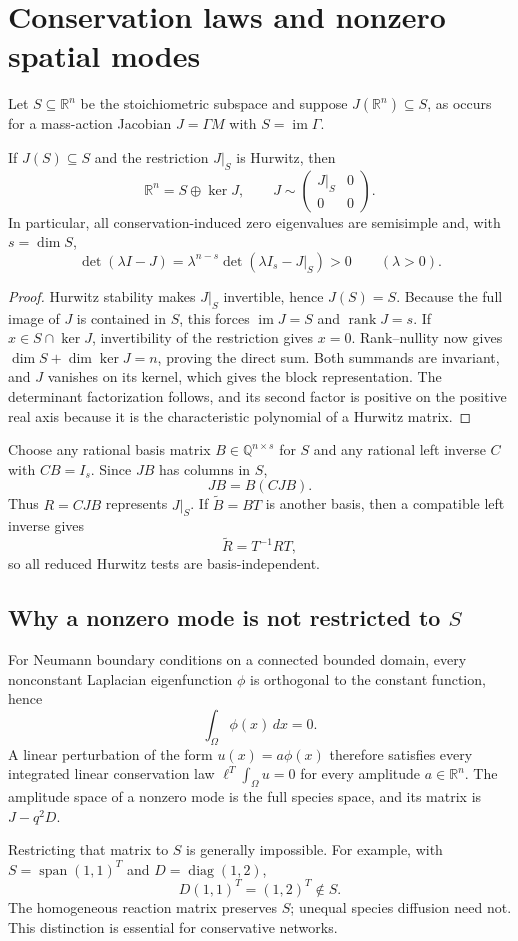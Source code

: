 \section{Conservation laws and nonzero spatial modes}
\label{sec:conservation-independent}

Let $S\subseteq\mathbb R^n$ be the stoichiometric subspace and suppose
$J(\mathbb R^n)\subseteq S$, as occurs for a mass-action Jacobian
$J=\Gamma M$ with $S=\operatorname{im}\Gamma$.

\begin{proposition}
\label{prop:conservation-splitting-independent}
If $J(S)\subseteq S$ and the restriction $J|_S$ is Hurwitz, then
\[
 \mathbb R^n=S\oplus\ker J,
 \qquad
 J\sim\begin{pmatrix}J|_S&0\\0&0\end{pmatrix}.
\]
In particular, all conservation-induced zero eigenvalues are semisimple and,
with $s=\dim S$,
\[
 \det(\lambda I-J)=\lambda^{n-s}
 \det(\lambda I_s-J|_S)>0\qquad(\lambda>0).
\]
\end{proposition}

\begin{proof}
Hurwitz stability makes $J|_S$ invertible, hence $J(S)=S$.  Because the full
image of $J$ is contained in $S$, this forces $\operatorname{im}J=S$ and
$\operatorname{rank}J=s$.  If $x\in S\cap\ker J$, invertibility of the
restriction gives $x=0$.  Rank--nullity now gives
$\dim S+\dim\ker J=n$, proving the direct sum.  Both summands are invariant,
and $J$ vanishes on its kernel, which gives the block representation.  The
determinant factorization follows, and its second factor is positive on the
positive real axis because it is the characteristic polynomial of a Hurwitz
matrix.
\end{proof}

Choose any rational basis matrix $B\in\mathbb Q^{n\times s}$ for $S$ and any
rational left inverse $C$ with $CB=I_s$.  Since $JB$ has columns in $S$,
\[
 JB=B(CJB).
\]
Thus $R=CJB$ represents $J|_S$.  If $\widetilde B=BT$ is another basis, then a
compatible left inverse gives
\[
 \widetilde R=T^{-1}RT,
\]
so all reduced Hurwitz tests are basis-independent.

\subsection{Why a nonzero mode is not restricted to \texorpdfstring{$S$}{S}}
For Neumann boundary conditions on a connected bounded domain, every
nonconstant Laplacian eigenfunction $\phi$ is orthogonal to the constant
function, hence
\[
 \int_\Omega\phi(x)\,dx=0.
\]
A linear perturbation of the form $u(x)=a\phi(x)$ therefore satisfies every
integrated linear conservation law $\ell^T\int_\Omega u=0$ for every amplitude
$a\in\mathbb R^n$.  The amplitude space of a nonzero mode is the full species
space, and its matrix is $J-q^2D$.

Restricting that matrix to $S$ is generally impossible.  For example, with
$S=\operatorname{span}(1,1)^T$ and $D=\operatorname{diag}(1,2)$,
\[
 D(1,1)^T=(1,2)^T\notin S.
\]
The homogeneous reaction matrix preserves $S$; unequal species diffusion need
not.  This distinction is essential for conservative networks.
